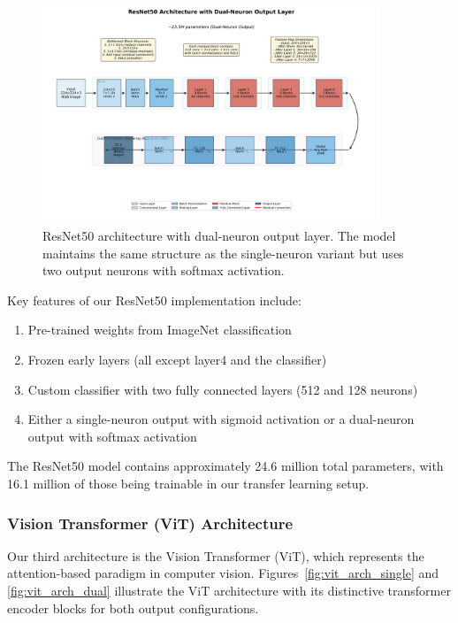 \begin{figure}[!htbp]
\centering
\includegraphics[width=0.9\textwidth]{figures/resnet50_2neuron_architecture.png}
\caption{ResNet50 architecture with dual-neuron output layer. The model maintains the same structure as the single-neuron variant but uses two output neurons with softmax activation.}
\label{fig:resnet50_arch_dual}
\end{figure}

Key features of our ResNet50 implementation include:
\begin{enumerate}
\item Pre-trained weights from ImageNet classification
\item Frozen early layers (all except layer4 and the classifier)
\item Custom classifier with two fully connected layers (512 and 128 neurons)
\item Either a single-neuron output with sigmoid activation or a dual-neuron output with softmax activation
\end{enumerate}

The ResNet50 model contains approximately 24.6 million total parameters, with 16.1 million of those being trainable in our transfer learning setup.

\FloatBarrier
\subsubsection{Vision Transformer (ViT) Architecture}

Our third architecture is the Vision Transformer (ViT), which represents the attention-based paradigm in computer vision. Figures~\ref{fig:vit_arch_single} and \ref{fig:vit_arch_dual} illustrate the ViT architecture with its distinctive transformer encoder blocks for both output configurations.


